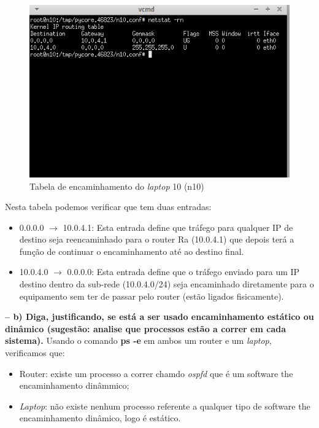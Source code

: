 \documentclass[a4paper]{article}
\begin{document}
\begin{figure}[!htb]
    \centering
    \includegraphics[scale=1]{parte2/laptop-tabela.png}\newline
    \caption{Tabela de encaminhamento do \textit{laptop} 10 (n10)}
    \label{fig:my_label}
\end{figure}
Nesta tabela podemos verificar que tem duas entradas:
\begin{itemize}
    \item 0.0.0.0 $\rightarrow$ 10.0.4.1: Esta entrada define que tráfego para qualquer IP de destino seja reencaminhado para o router Ra (10.0.4.1) que depois terá a função de continuar o encaminhamento até ao destino final.
    \item 10.0.4.0 $\rightarrow$ 0.0.0.0: Esta entrada define que o tráfego enviado para um IP destino dentro da sub-rede (10.0.4.0/24) seja encaminhado diretamente para o equipamento sem ter de passar pelo router  (estão ligados fisicamente).
\end{itemize}

\textbf{-- b) Diga, justificando, se está a ser usado encaminhamento estático ou dinâmico (sugestão: analise que processos estão a correr em cada sistema).}\newline
Usando o comando \textbf{ps -e} em ambos um router e um \textit{laptop}, verificamos que:
\begin{itemize}
    \item Router: existe um processo a correr chamdo \textit{ospfd} que é um software the encaminhamento dinâmmico;
    \item \textit{Laptop}: não existe nenhum processo referente a qualquer tipo de software the encaminhamento dinâmico, logo é estático.
\end{itemize}
\end{document}

